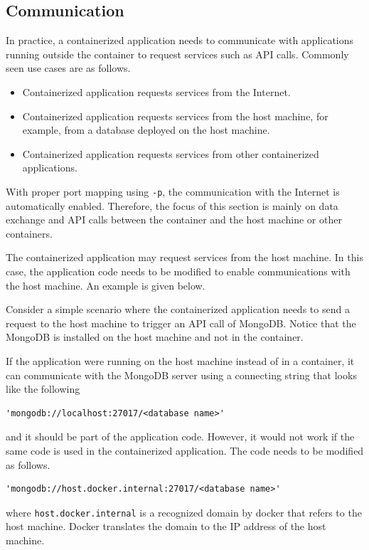 \subsection{Communication}

In practice, a containerized application needs to communicate with applications running outside the container to request services such as API calls. Commonly seen use cases are as follows.
\begin{itemize}
	\item Containerized application requests services from the Internet.
	\item Containerized application requests services from the host machine, for example, from a database deployed on the host machine.
	\item Containerized application requests services from other containerized applications.
\end{itemize}

With proper port mapping using \verb|-p|, the communication with the Internet is automatically enabled. Therefore, the focus of this section is mainly on data exchange and API calls between the container and the host machine or other containers.

The containerized application may request services from the host machine. In this case, the application code needs to be modified to enable communications with the host machine. An example is given below.

Consider a simple scenario where the containerized application needs to send a request to the host machine to trigger an API call of MongoDB. Notice that the MongoDB is installed on the host machine and not in the container.

If the application were running on the host machine instead of in a container, it can communicate with the MongoDB server using a connecting string that looks like the following
\begin{lstlisting}
'mongodb://localhost:27017/<database name>'	
\end{lstlisting}
and it should be part of the application code. However, it would not work if the same code is used in the containerized application. The code needs to be modified as follows.
\begin{lstlisting}
'mongodb://host.docker.internal:27017/<database name>'	
\end{lstlisting}
where \verb|host.docker.internal| is a recognized domain by docker that refers to the host machine. Docker translates the domain to the IP address of the host machine.

